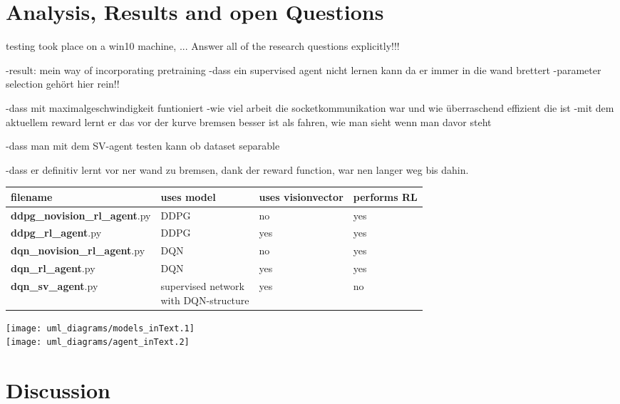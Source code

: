 \chapter{Analysis, Results and open Questions}

\label{ch:analysis}

testing took place on a win10 machine, ...
Answer all of the research questions explicitly!!!

-result: mein way of incorporating pretraining
-dass ein supervised agent nicht lernen kann da er immer in die wand brettert
-parameter selection gehört hier rein!!

-dass mit maximalgeschwindigkeit funtioniert
-wie viel arbeit die socketkommunikation war und wie überraschend effizient die ist
-mit dem aktuellem reward lernt er das vor der kurve bremsen besser ist als fahren, wie man sieht wenn man davor steht

-dass man mit dem SV-agent testen kann ob dataset separable

-dass er definitiv lernt vor ner wand zu bremsen, dank der reward function, war nen langer weg bis dahin.




\begin{tabular}{l l l l}
	filename & uses model & uses visionvector & performs RL\\
	\hline
	\textbf{ddpg\_novision\_rl\_agent}.py & DDPG & no & yes\\	
	\textbf{ddpg\_rl\_agent}.py & DDPG & yes & yes\\
	\textbf{dqn\_novision\_rl\_agent}.py & DQN & no & yes\\
	\textbf{dqn\_rl\_agent}.py & DQN & yes & yes\\
	\textbf{dqn\_sv\_agent}.py & \blap{supervised network\\ with DQN-structure} & yes & no\\[2em]
\end{tabular}


\texttt{[image: uml\_diagrams/models\_inText.1]}\\
\newpage
\texttt{[image: uml\_diagrams/agent\_inText.2]}  

\chapter{Discussion}

